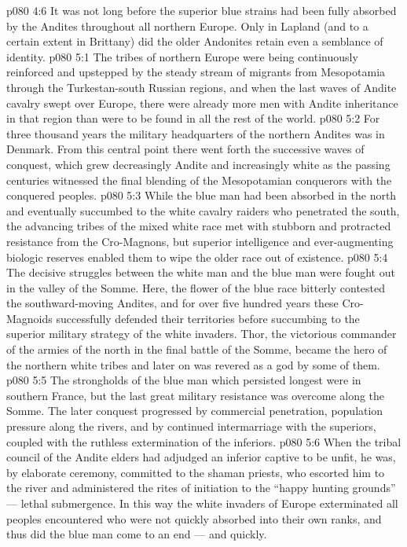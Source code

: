 \vs p080 4:6 \pc It was not long before the superior blue strains had been fully absorbed by the Andites throughout all northern Europe. Only in Lapland (and to a certain extent in Brittany) did the older Andonites retain even a semblance of identity.
\vs p080 5:1 The tribes of northern Europe were being continuously reinforced and upstepped by the steady stream of migrants from Mesopotamia through the Turkestan\hyp{}south Russian regions, and when the last waves of Andite cavalry swept over Europe, there were already more men with Andite inheritance in that region than were to be found in all the rest of the world.
\vs p080 5:2 For three thousand years the military headquarters of the northern Andites was in Denmark. From this central point there went forth the successive waves of conquest, which grew decreasingly Andite and increasingly white as the passing centuries witnessed the final blending of the Mesopotamian conquerors with the conquered peoples.
\vs p080 5:3 \pc While the blue man had been absorbed in the north and eventually succumbed to the white cavalry raiders who penetrated the south, the advancing tribes of the mixed white race met with stubborn and protracted resistance from the Cro\hyp{}Magnons, but superior intelligence and ever\hyp{}augmenting biologic reserves enabled them to wipe the older race out of existence.
\vs p080 5:4 The decisive struggles between the white man and the blue man were fought out in the valley of the Somme. Here, the flower of the blue race bitterly contested the southward\hyp{}moving Andites, and for over five hundred years these Cro\hyp{}Magnoids successfully defended their territories before succumbing to the superior military strategy of the white invaders. Thor, the victorious commander of the armies of the north in the final battle of the Somme, became the hero of the northern white tribes and later on was revered as a god by some of them.
\vs p080 5:5 \pc The strongholds of the blue man which persisted longest were in southern France, but the last great military resistance was overcome along the Somme. The later conquest progressed by commercial penetration, population pressure along the rivers, and by continued intermarriage with the superiors, coupled with the ruthless extermination of the inferiors.
\vs p080 5:6 When the tribal council of the Andite elders had adjudged an inferior captive to be unfit, he was, by elaborate ceremony, committed to the shaman priests, who escorted him to the river and administered the rites of initiation to the “happy hunting grounds” --- lethal submergence. In this way the white invaders of Europe exterminated all peoples encountered who were not quickly absorbed into their own ranks, and thus did the blue man come to an end --- and quickly.
